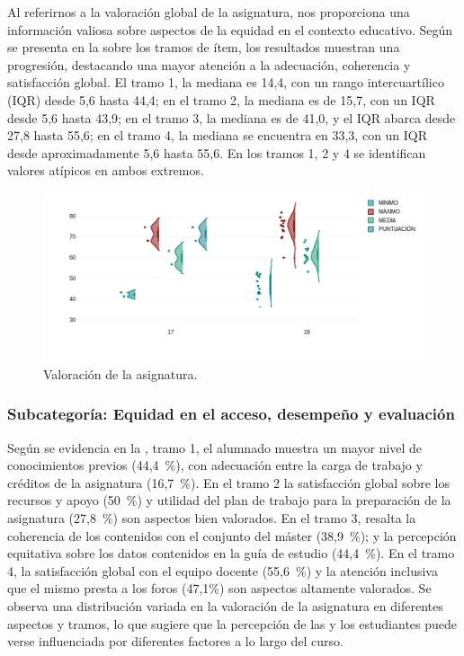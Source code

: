 Al referirnos a la valoración global de la asignatura, nos proporciona
una información valiosa sobre aspectos de la equidad en el contexto
educativo. Según se presenta en la  sobre los tramos de ítem,
los resultados muestran una progresión, destacando una mayor atención a
la adecuación, coherencia y satisfacción global. El tramo 1, la mediana
es 14,4, con un rango intercuartílico (IQR) desde 5,6 hasta 44,4; en el
tramo 2, la mediana es de 15,7, con un IQR desde 5,6 hasta 43,9; en el
tramo 3, la mediana es de 41,0, y el IQR abarca desde 27,8 hasta 55,6;
en el tramo 4, la mediana se encuentra en 33,3, con un IQR desde
aproximadamente 5,6 hasta 55,6. En los tramos 1, 2 y 4 se identifican
valores atípicos en ambos extremos.
	
\begin{figure}[htbp]
	\centering
    \begin{minipage}{.85\textwidth}
	\caption{Valoración de la asignatura.}
	\label{fig-03}
	\includegraphics[width=\textwidth]{Imagem3.png}
    \end{minipage}
\end{figure}
	
\subsubsection{Subcategoría: Equidad en el acceso, desempeño y evaluación}\label{sub-sub-sec-equidadenelacceso}
	
Según se evidencia en la , tramo 1, el alumnado muestra un mayor
nivel de conocimientos previos (44,4~\%), con adecuación entre la carga
de trabajo y créditos de la asignatura (16,7~\%). En el tramo 2 la
satisfacción global sobre los recursos y apoyo (50~\%) y utilidad del
plan de trabajo para la preparación de la asignatura (27,8~\%) son
aspectos bien valorados. En el tramo 3, resalta la coherencia de los
contenidos con el conjunto del máster (38,9~\%); y la percepción
equitativa sobre los datos contenidos en la guía de estudio (44,4~\%).
En el tramo 4, la satisfacción global con el equipo docente (55,6~\%) y
la atención inclusiva que el mismo presta a los foros (47,1\%) son
aspectos altamente valorados. Se observa una distribución variada en la
valoración de la asignatura en diferentes aspectos y tramos, lo que
sugiere que la percepción de las y los estudiantes puede verse
influenciada por diferentes factores a lo largo del curso.
	

